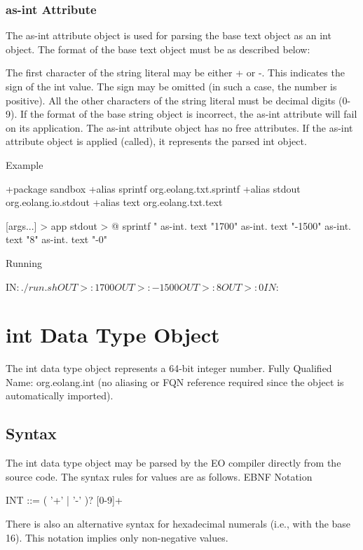 \documentclass[12pt]{book}
\begin{document}
\subsubsection{as-int Attribute}
The as-int attribute object is used for parsing the base text object as an int object.
The format of the base text object must be as described below:

The first character of the string literal may be either + or -. This indicates the sign of the int value. The sign may be omitted (in such a case, the number is positive).
All the other characters of the string literal must be decimal digits (0-9).
If the format of the base string object is incorrect, the as-int attribute will fail on its application.
The as-int attribute object has no free attributes.
If the as-int attribute object is applied (called), it represents the parsed int object.

Example

\begin{ffcode}
+package sandbox
+alias sprintf org.eolang.txt.sprintf
+alias stdout org.eolang.io.stdout
+alias text org.eolang.txt.text

[args...] > app
  stdout > @
    sprintf
      "%
    as-int.
      text "1700"
    as-int.
      text "-1500"
    as-int.
      text "8"
    as-int.
      text "-0"

Running

IN$: ./run.sh
OUT>: 1700
OUT>: -1500
OUT>: 8
OUT>: 0
IN$: 
\end{ffcode}

\section{int Data Type Object}
The int data type object represents a 64-bit integer number.
Fully Qualified Name: org.eolang.int (no aliasing or FQN reference required since the object is automatically imported).

\subsection{Syntax}
The int data type object may be parsed by the EO compiler directly from the source code. The syntax rules for values are as follows.
EBNF Notation

\begin{ffcode}
INT      ::= ( '+' | '-' )? [0-9]+
\end{ffcode}
There is also an alternative syntax for hexadecimal numerals (i.e., with the base 16). This notation implies only non-negative values.
\end{document}
